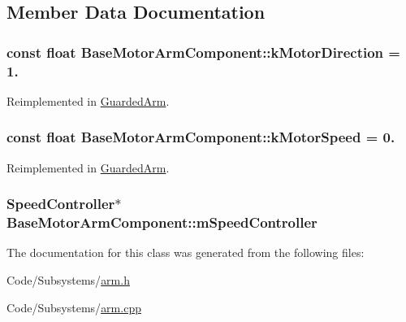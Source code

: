 \subsection{\-Member \-Data \-Documentation}
\hypertarget{class_base_motor_arm_component_a93cac72cee3f552037027ab847372f12}{
\subsubsection[{k\-Motor\-Direction}]{\setlength{\rightskip}{0pt plus 5cm}const float {\bf \-Base\-Motor\-Arm\-Component\-::k\-Motor\-Direction} = 1.}}\label{class_base_motor_arm_component_a93cac72cee3f552037027ab847372f12}


\-Reimplemented in \hyperlink{class_guarded_arm_a36ce84955e289c08c4eb791d3362b568}{\-Guarded\-Arm}.

\hypertarget{class_base_motor_arm_component_ad8633011d5b9b10ca813a8504f38e74c}{
\subsubsection[{k\-Motor\-Speed}]{\setlength{\rightskip}{0pt plus 5cm}const float {\bf \-Base\-Motor\-Arm\-Component\-::k\-Motor\-Speed} = 0.}}\label{class_base_motor_arm_component_ad8633011d5b9b10ca813a8504f38e74c}


\-Reimplemented in \hyperlink{class_guarded_arm_a4dd9a387e839ed3a965c721c9910b2da}{\-Guarded\-Arm}.

\hypertarget{class_base_motor_arm_component_ad928d86f5eb38d02f43a65e0491dcad8}{
\subsubsection[{m\-Speed\-Controller}]{\setlength{\rightskip}{0pt plus 5cm}\-Speed\-Controller$\ast$ {\bf \-Base\-Motor\-Arm\-Component\-::m\-Speed\-Controller}}}\label{class_base_motor_arm_component_ad928d86f5eb38d02f43a65e0491dcad8}


\-The documentation for this class was generated from the following files\-:\begin{DoxyCompactItemize}
\item 
\-Code/\-Subsystems/\hyperlink{arm_8h}{arm.\-h}\item 
\-Code/\-Subsystems/\hyperlink{arm_8cpp}{arm.\-cpp}\end{DoxyCompactItemize}
